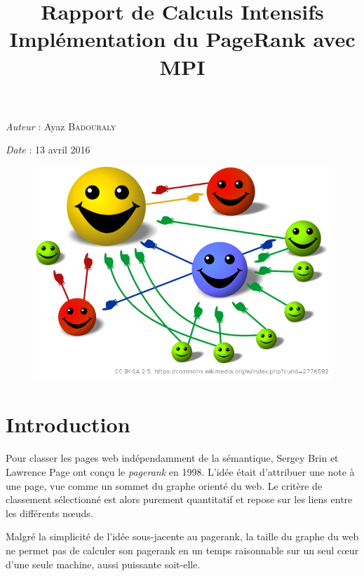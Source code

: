 \documentclass[a4paper,12pt]{article}
\title{Rapport de Calculs Intensifs\\Implémentation du PageRank avec MPI}
\author{}
\date{}
\begin{document}
\maketitle

\thispagestyle{empty}

\textit{Auteur} : Ayaz \textsc{Badouraly}

\textit{Date} : 13 avril 2016

\vspace{2cm}

\begin{figure}[h]  
  \centering
  \includegraphics[width=.9\linewidth]{pagerank.png}
\end{figure}


\newpage

{\color{white}{.}}

\vspace{1cm}

\tableofcontents

\newpage

\section{Introduction}

Pour classer les pages web indépendamment de la sémantique, Sergey Brin et Lawrence Page ont conçu le \textit{pagerank} en 1998. 
L'idée était d'attribuer une note à une page, vue comme un sommet du graphe orienté du web. 
Le critère de classement sélectionné est alors purement quantitatif et repose sur les liens entre les différents n\oe{}uds.

\bigskip

Malgré la simplicité de l'idée sous-jacente au pagerank, la taille du graphe du web ne permet pas de calculer son pagerank en un temps raisonnable sur un seul c\oe{}ur d'une seule machine, aussi puissante soit-elle.
\end{document}
